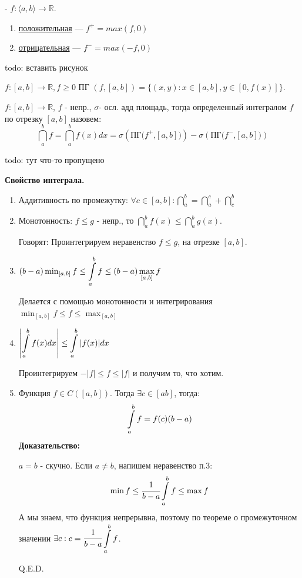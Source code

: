   - $f:\langle a,b\rangle \rightarrow \mathbb{R} $.
\begin{enumerate}
    \item \uline{положительная} --- $f^+ = max(f,0)$
    \item \uline{отрицательная} --- $f^- = max(-f,0)$
\end{enumerate}

todo: вставить рисунок

 $f:[a,b] \rightarrow \mathbb{R}, f\geq 0$ ПГ $(f,[a,b]) = \{(x,y): x\in [a,b], y \in [0,f(x)]\}$.

 $f: [a,b] \rightarrow \mathbb{R}$, $f$ - непр., $\sigma $- осл. адд площадь, тогда определенный интегралом $f$ по отрезку $[a,b]$ назовем: $$\dint\limits_{a}^b f =\dint\limits_{a}^b f(x) dx =\sigma(\text{ПГ($f^+$,$[a,b]$)})-\sigma(\text{ПГ($f^-$,$[a,b]$)})$$

todo: тут что-то пропущено

\textbf{Свойство интеграла.}
\begin{enumerate}
    \item Аддитивность по промежутку: $\forall c \in [a,b]:\dint\limits_{a}^b =\dint\limits_{a}^c + \dint\limits_{c}^b $
    \item Монотонность: $f\leq g$ - непр., то $\dint\limits_{a}^b f(x)\leq \dint\limits_{a}^b g(x)$. 

    Говорят: Проинтегрируем неравенство $f\leq g$, на отрезке $[a,b]$.

    \item $(b-a)\min_{[a,b]} f \leq\displaystyle\int\limits_{a}^{b}f\leq (b-a)\max_{[a,b]}f$

    Делается с помощью монотонности и интегрирования $\min_{[a,b]}f\leq f\leq\max_{[a,b]}$

    \item $\left|\displaystyle\int\limits_{a}^{b}f(x)dx\right|\leq \displaystyle\int\limits_{a}^{b}|f(x)|dx$

    Проинтегрируем $-|f|\leq f\leq |f|$ и получим то, что хотим.

    \item {}

    Функция $f \in C([a,b])$. Тогда $\exists c \in [ab]$, тогда:
    $$\displaystyle\int\limits_{a}^{b}f = f(c)(b-a)$$
    \textbf{Доказательство:} 
    
    $a=b$ - скучно. Если $a\neq b$, напишем неравенство п.3:
    $$\min f\leq \cfrac{1}{b-a}\displaystyle\int\limits_{a}^{b}f\leq \max f$$ А мы знаем, что функция непрерывна, поэтому по теореме о промежуточном значении $\exists c: c = \cfrac{1}{b-a}\displaystyle\int\limits_{a}^{b}f$. 
    
    \hfill Q.E.D.
\end{enumerate}

